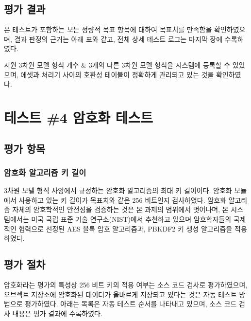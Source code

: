 \documentclass[11pt,oneside,openany,itemph,a4paper,chapter]{oblivoir}
\newenvironment{tablekeyvalue}[2]
{\bgroup
\table[H] \tabularx{\linewidth}{|
>{\setlength{\baselineskip}{1.2\baselineskip}}P{#1\linewidth}|
>{\setlength{\baselineskip}{1.2\baselineskip}}P{#2\linewidth}|}
\hline}
{\endtabularx \endtable \egroup}
\begin{document}
\subsection{평가 결과}
본 테스트가 포함하는 모든 정량적 목표 항목에 대하여 목표치를 만족함을 확인하였으며, 결과 판정의 근거는 아래 표와 같고, 전체 상세 테스트 로그는 마지막 장에 수록하였다.

\begin{tablekeyvalue}{0.3}{0.7}
지원 3차원 모델 형식 개수 & 3개의 다른 3차원 모델 형식을 시스템에 등록할 수 있었으며, 에셋과 처리기 사이의 호환성 테이블이 정확하게 관리되고 있는 것을 확인하였다. \\ \hline
\end{tablekeyvalue}

\section{테스트 \#4\label{test4} 암호화 테스트}
\subsection{평가 항목}
\subsubsection{암호화 알고리즘 키 길이}
3차원 모델 형식 사양에서 규정하는 암호화 알고리즘의 최대 키 길이이다. 암호화 모듈에서 사용하고 있는 키 길이가 목표치와 같은 256 비트인지 검사하였다. 암호화 알고리즘 자체의 암호학적인 안전성을 검증하는 것은 본 과제의 범위에서 벗어나며, 본 시스템에서는 미국 국립 표준 기술 연구소(NIST)에서 추천하고 있으며 암호학자들의 국제적인 협력으로 선정된 AES 블록 암호 알고리즘과, PBKDF2 키 생성 알고리즘을 적용하였다.

\subsection{평가 절차}
암호화라는 평가의 특성상 256 비트 키의 적용 여부는 소스 코드 검사로 평가하였으며, 오브젝트 저장소에 암호화된 데이터가 올바르게 저장되고 있다는 것은 자동 테스트 방법으로 평가하였다. 아래는 목록은 자동 테스트 순서를 나타내고 있으며, 소스 코드 검사 내용은 평가 결과에 수록하였다.
\end{document}
